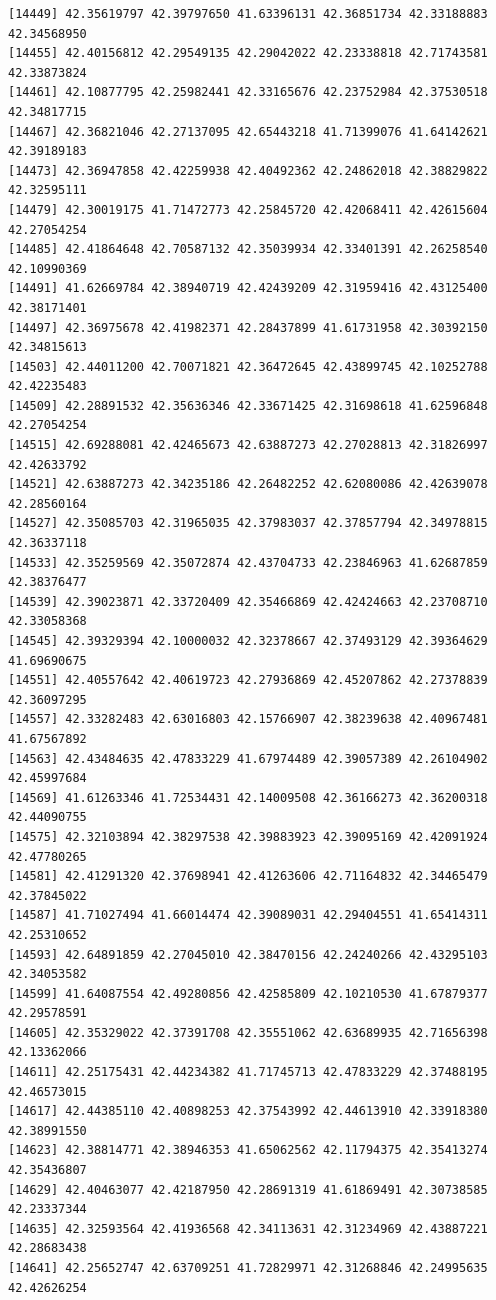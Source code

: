 \documentclass[
  letterpaper,
  DIV=11,
  numbers=noendperiod]{scrartcl}
\begin{document}
\begin{verbatim}
[14449] 42.35619797 42.39797650 41.63396131 42.36851734 42.33188883 42.34568950
[14455] 42.40156812 42.29549135 42.29042022 42.23338818 42.71743581 42.33873824
[14461] 42.10877795 42.25982441 42.33165676 42.23752984 42.37530518 42.34817715
[14467] 42.36821046 42.27137095 42.65443218 41.71399076 41.64142621 42.39189183
[14473] 42.36947858 42.42259938 42.40492362 42.24862018 42.38829822 42.32595111
[14479] 42.30019175 41.71472773 42.25845720 42.42068411 42.42615604 42.27054254
[14485] 42.41864648 42.70587132 42.35039934 42.33401391 42.26258540 42.10990369
[14491] 41.62669784 42.38940719 42.42439209 42.31959416 42.43125400 42.38171401
[14497] 42.36975678 42.41982371 42.28437899 41.61731958 42.30392150 42.34815613
[14503] 42.44011200 42.70071821 42.36472645 42.43899745 42.10252788 42.42235483
[14509] 42.28891532 42.35636346 42.33671425 42.31698618 41.62596848 42.27054254
[14515] 42.69288081 42.42465673 42.63887273 42.27028813 42.31826997 42.42633792
[14521] 42.63887273 42.34235186 42.26482252 42.62080086 42.42639078 42.28560164
[14527] 42.35085703 42.31965035 42.37983037 42.37857794 42.34978815 42.36337118
[14533] 42.35259569 42.35072874 42.43704733 42.23846963 41.62687859 42.38376477
[14539] 42.39023871 42.33720409 42.35466869 42.42424663 42.23708710 42.33058368
[14545] 42.39329394 42.10000032 42.32378667 42.37493129 42.39364629 41.69690675
[14551] 42.40557642 42.40619723 42.27936869 42.45207862 42.27378839 42.36097295
[14557] 42.33282483 42.63016803 42.15766907 42.38239638 42.40967481 41.67567892
[14563] 42.43484635 42.47833229 41.67974489 42.39057389 42.26104902 42.45997684
[14569] 41.61263346 41.72534431 42.14009508 42.36166273 42.36200318 42.44090755
[14575] 42.32103894 42.38297538 42.39883923 42.39095169 42.42091924 42.47780265
[14581] 42.41291320 42.37698941 42.41263606 42.71164832 42.34465479 42.37845022
[14587] 41.71027494 41.66014474 42.39089031 42.29404551 41.65414311 42.25310652
[14593] 42.64891859 42.27045010 42.38470156 42.24240266 42.43295103 42.34053582
[14599] 41.64087554 42.49280856 42.42585809 42.10210530 41.67879377 42.29578591
[14605] 42.35329022 42.37391708 42.35551062 42.63689935 42.71656398 42.13362066
[14611] 42.25175431 42.44234382 41.71745713 42.47833229 42.37488195 42.46573015
[14617] 42.44385110 42.40898253 42.37543992 42.44613910 42.33918380 42.38991550
[14623] 42.38814771 42.38946353 41.65062562 42.11794375 42.35413274 42.35436807
[14629] 42.40463077 42.42187950 42.28691319 41.61869491 42.30738585 42.23337344
[14635] 42.32593564 42.41936568 42.34113631 42.31234969 42.43887221 42.28683438
[14641] 42.25652747 42.63709251 41.72829971 42.31268846 42.24995635 42.42626254

\end{verbatim}
\end{document}
